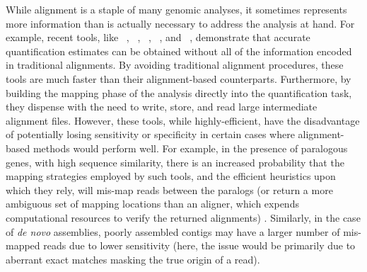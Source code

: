 While alignment is a staple of many genomic analyses, it sometimes represents more 
information than is actually necessary to address the analysis at hand. For example, 
recent tools, like \sailfish~\citep{Patro2014Sailfish}, \rnaskim~\citep{zhang2014rna}, 
\kallisto~\citep{Bray2016Kallisto}, \salmon~\citep{Patro2017Salmon}, and 
\fleximer~\citep{ju2017fleximer}, demonstrate that accurate quantification estimates can 
be obtained without all of the information encoded in traditional alignments. By avoiding 
traditional alignment procedures, these tools are much faster than their alignment-based 
counterparts. Furthermore, by building the mapping phase of the analysis directly into the 
quantification task, they dispense with the need to  write, store, and read large 
intermediate alignment files. However, these \nab tools, while highly-efficient, have 
the disadvantage of potentially losing sensitivity or specificity in certain cases where 
alignment-based methods would perform well. For example, in the presence of paralogous 
genes, with high sequence similarity, there is an increased probability that the mapping 
strategies employed by such tools, and the efficient heuristics upon which they rely, will 
mis-map reads between the paralogs (or return a more ambiguous set of mapping locations 
than an aligner, which expends computational resources to verify the returned alignments) 
\citep{axtell2014butter}. Similarly, in the case of \textit{de novo} assemblies, poorly 
assembled contigs may have a larger number of mis-mapped reads due to lower sensitivity 
(here, the issue would be primarily due to aberrant exact matches masking the true origin 
of a read).

